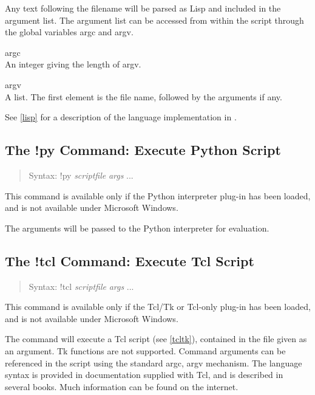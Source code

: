 Any text following the filename will be parsed as Lisp and included in
the argument list.  The argument list can be accessed from within the
script through the global variables {\vt argc} and {\vt argv}.
\begin{description}
\item{\vt argc}\\
An integer giving the length of {\vt argv}.
\item{\vt argv}\\
A list.  The first element is the file name, followed by the arguments
if any.
\end{description}

See \ref{lisp} for a description of the language implementation in
{\Xic}.

\subsection{The {\cb !py} Command: Execute Python Script}
\begin{quote}
Syntax: {\vt !py} {\it scriptfile} {\it args} ...
\end{quote}
This command is available only if the Python interpreter plug-in has
been loaded, and is not available under Microsoft Windows.

The arguments will be passed to the Python interpreter
for evaluation.

\subsection{The {\cb !tcl} Command: Execute Tcl Script}
\begin{quote}
Syntax: {\vt !tcl} {\it scriptfile} {\it args} ...
\end{quote}
This command is available only if the Tcl/Tk or Tcl-only plug-in has
been loaded, and is not available under Microsoft Windows. 

The command will execute a Tcl script (see \ref{tcltk}), contained in
the file given as an argument.  Tk functions are not supported. 
Command arguments can be referenced in the script using the standard
{\vt argc}, {\vt argv} mechanism.  The language syntax is provided in
documentation supplied with Tcl, and is described in several books. 
Much information can be found on the internet.

